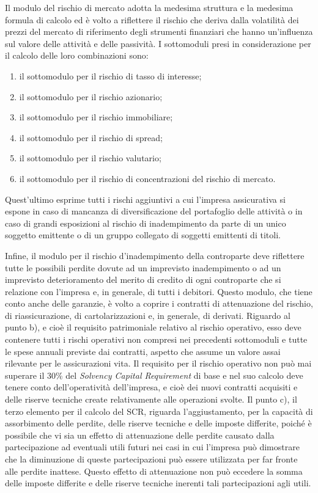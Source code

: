 Il modulo del rischio di mercato adotta la medesima struttura e la medesima formula di calcolo ed è volto a riflettere il rischio che deriva dalla volatilità dei prezzi del mercato di riferimento degli strumenti finanziari che hanno un’influenza sul valore delle attività e delle passività. I sottomoduli presi in considerazione per il calcolo delle loro combinazioni sono:
\begin{enumerate}
\item	 il sottomodulo per il rischio di tasso di interesse;
\item	 il sottomodulo per il rischio azionario;
\item	 il sottomodulo per il rischio immobiliare;
\item	 il sottomodulo per il rischio di spread;
\item	 il sottomodulo per il rischio valutario;
\item	 il sottomodulo per il rischio di concentrazioni del rischio di mercato.
\end{enumerate}
Quest’ultimo esprime tutti i rischi aggiuntivi a cui l’impresa assicurativa si espone in caso di mancanza di diversificazione del portafoglio delle attività o in caso di grandi esposizioni al rischio di inadempimento da parte di un unico soggetto emittente o di un gruppo collegato di soggetti emittenti di titoli.

Infine, il modulo per il rischio d’inadempimento della controparte deve riflettere tutte le possibili perdite dovute ad un imprevisto inadempimento o ad un imprevisto deterioramento del merito di credito di ogni controparte che si relazione con l’impresa e, in generale, di tutti i debitori. Questo modulo, che tiene conto anche delle garanzie, è volto a coprire i contratti di attenuazione del rischio, di riassicurazione, di cartolarizzazioni e, in generale, di derivati.
Riguardo al punto b), e cioè il requisito patrimoniale relativo al rischio operativo, esso deve contenere tutti i rischi operativi non compresi nei precedenti sottomoduli e tutte le spese annuali previste dai contratti, aspetto che assume un valore assai rilevante per le assicurazioni vita.
Il requisito per il rischio operativo non può mai superare il 30\% del {\itshape Solvency Capital Requirement} di base e nel suo calcolo deve tenere conto dell’operatività dell’impresa, e cioè dei nuovi contratti acquisiti e delle riserve tecniche create relativamente alle operazioni svolte.
Il punto c), il terzo elemento per il calcolo del SCR, riguarda l’aggiustamento, per la capacità di assorbimento delle perdite, delle riserve tecniche e delle imposte differite, poiché è possibile che vi sia un effetto di attenuazione delle perdite causato dalla partecipazione ad eventuali utili futuri nei casi in cui l’impresa può dimostrare che la diminuzione di queste partecipazioni può essere utilizzata per far fronte alle perdite inattese. Questo effetto di attenuazione non può eccedere la somma delle imposte differite e delle riserve tecniche inerenti tali partecipazioni agli utili.

